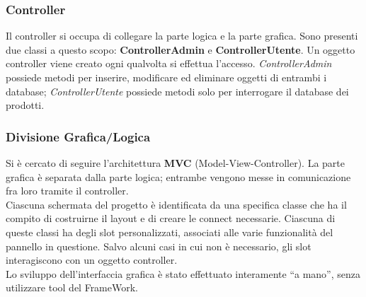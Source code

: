 \documentclass[a4paper,10pt] {article}
\begin{document}
\subsubsection{Controller}
Il controller si occupa di collegare la parte logica e la parte grafica. Sono presenti due classi a questo scopo: \textbf{ControllerAdmin} e \textbf{ControllerUtente}.
Un oggetto controller viene creato ogni qualvolta si effettua l'accesso. \textsl{ControllerAdmin} possiede metodi per inserire, modificare ed eliminare oggetti di
entrambi i database; \textsl{ControllerUtente} possiede metodi solo per interrogare il database dei prodotti.

\subsubsection{Divisione Grafica/Logica}
Si è cercato di seguire l'architettura \textbf{MVC} (Model-View-Controller). La parte grafica è separata dalla parte logica; entrambe vengono messe in comunicazione
fra loro tramite il controller.\\
Ciascuna schermata del progetto è identificata da una specifica classe che ha il compito di costruirne il layout e di creare le connect necessarie. Ciascuna di
queste classi ha degli slot personalizzati, associati alle varie funzionalità del pannello in questione. Salvo alcuni casi in cui non è necessario, gli slot 
interagiscono con un oggetto controller. \\
Lo sviluppo dell'interfaccia grafica è stato effettuato interamente ``a mano'', senza utilizzare tool del FrameWork.
\end{document}

